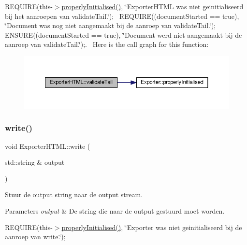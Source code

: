 R\+E\+Q\+U\+I\+RE(this-\/$>$\hyperlink{class_exporter_aafd9df9210aeefd7bb7fd434fc317cf0}{properly\+Initialised()}, \char`\"{}\+Exporter\+H\+T\+M\+L was niet geinitialiseerd bij het aanroepen van validate\+Tail.\char`\"{});~\newline
R\+E\+Q\+U\+I\+RE((document\+Started == true), \char`\"{}\+Document was nog niet aangemaakt bij de aanroep van validate\+Tail.\char`\"{}); E\+N\+S\+U\+RE((document\+Started == true), \char`\"{}\+Document werd niet aangemaakt bij de aanroep van validate\+Tail.\char`\"{});.~\newline
Here is the call graph for this function\+:
\nopagebreak
\begin{figure}[H]
\begin{center}
\leavevmode
\includegraphics[width=350pt]{class_exporter_h_t_m_l_ab9d3ebcfa054f02f08ab34e1a6298963_cgraph}
\end{center}
\end{figure}
\mbox{\label{class_exporter_h_t_m_l_aa5b12621501f09a9a082e9337fbf943c}} 
\subsubsection{\texorpdfstring{write()}{write()}}
{\footnotesize\ttfamily void Exporter\+H\+T\+M\+L\+::write (\begin{DoxyParamCaption}\item[{std\+::string \&}]{output }\end{DoxyParamCaption})\hspace{0.3cm}{\ttfamily [virtual]}}



Stuur de output string naar de output stream. 


\begin{DoxyParams}{Parameters}
{\em output} & De string die naar de output gestuurd moet worden.\\
\hline
\end{DoxyParams}
R\+E\+Q\+U\+I\+RE(this-\/$>$\hyperlink{class_exporter_aafd9df9210aeefd7bb7fd434fc317cf0}{properly\+Initialised()}, \char`\"{}\+Exporter was niet geinitialiseerd bij de aanroep van write.\char`\"{});~\newline


